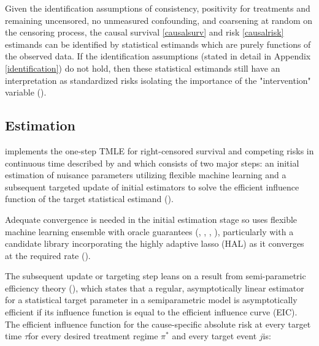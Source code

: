 \documentclass{report}
\newcommand{\1}{\ensuremath{\mathbf{1}}}
\newcommand{\trt}{\ensuremath{\pi^*}}
\newcommand{\tk}{\ensuremath{\tau}}
\newcommand{\jj}{\ensuremath{j}}
\begin{document}
Given the identification assumptions of consistency, positivity for treatments and remaining uncensored, no unmeasured confounding, and coarsening at random on the censoring process, the causal survival \eqref{causalsurv} and risk \eqref{causalrisk} estimands can be identified by statistical estimands which are purely functions of the observed data. If the identification assumptions (stated in detail in Appendix \ref{identification}) do not hold, then these statistical estimands still have an interpretation as standardized risks isolating the importance of the "intervention" variable (\cite{laan_statistical_2006}).  

\subsection{Estimation}
\label{estimation}
 implements the one-step TMLE for right-censored survival and competing risks in continuous time described by \cite{rytgaard_continuous-time_2021} and \cite{rytgaard_one-step_2021} which consists of two major steps: an initial estimation of nuisance parameters utilizing flexible machine learning and a subsequent targeted update of initial estimators to solve the efficient influence function of the target statistical estimand (\cite{laan_unified_2003-1,kennedy2016semiparametric}).

Adequate convergence is needed in the initial estimation stage so  uses flexible machine learning ensemble with oracle guarantees (\cite{laan_super_2007}, \cite{polley_superlearner_2021}, \cite{laan_unified_2003}, \cite{vaart_oracle_2006}), particularly with a candidate library incorporating the highly adaptive lasso (HAL) as it converges at the required rate (\cite{laan_generally_2017,benkeser_highly_2016,rytgaard_continuous-time_2021}). 

The subsequent update or targeting step leans on a result from semi-parametric efficiency theory (\cite{bickel_efficient_1998}), which states that a regular, asymptotically linear estimator for a statistical target parameter in a semiparametric model is asymptotically efficient if its influence function is equal to the efficient influence curve (EIC). The efficient influence function for the cause-specific absolute risk at every target time \tk for every desired treatment regime \(\trt\) and every target event \jj is: 
\end{document}
